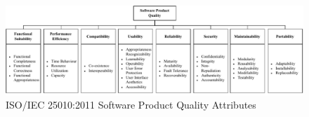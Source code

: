 \begin{figure}[!htbp]
    \centering
    \includegraphics[width=\textwidth]{assets/ISO-IEC 25010-2011.pdf}   
    \caption{ISO/IEC 25010:2011 Software Product Quality Attributes}
    \label{fig:iso25010}
\end{figure}